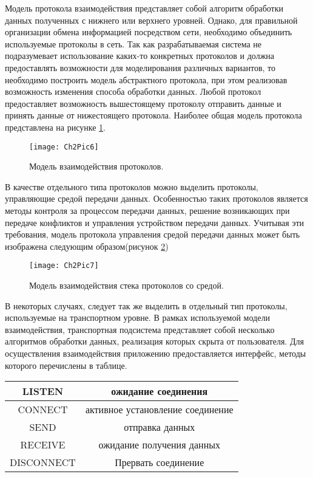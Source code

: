     Модель протокола взаимодействия представляет собой алгоритм обработки данных полученных с нижнего или верхнего уровней. Однако, для правильной организации обмена информацией посредством сети, необходимо объединить используемые протоколы в сеть. Так как разрабатываемая система не подразумевает использование каких-то конкретных протоколов и должна предоставлять возможности для моделирования различных вариантов, то необходимо построить модель абстрактного протокола, при этом реализовав возможность изменения способа обработки данных. Любой протокол предоставляет возможность вышестоящему протоколу отправить данные и принять данные от нижестоящего протокола. Наиболее общая модель протокола представлена на рисунке \ref{Pic6}.
    \begin{figure}\center
        \texttt{[image: Ch2Pic6]}
        \caption{Модель взаимодействия протоколов.} \label{Pic6}
    \end{figure}
    В качестве отдельного типа протоколов можно выделить протоколы, управляющие средой передачи данных. Особенностью таких протоколов является методы контроля за процессом передачи данных, решение возникающих при передаче конфликтов и управления устройством передачи данных. Учитывая эти требования, модель протокола управления средой передачи данных может быть изображена следующим образом(рисунок \ref{Pic7})
    \begin{figure}\center
        \texttt{[image: Ch2Pic7]}
        \caption{Модель взаимодействия стека протоколов со средой.} \label{Pic7}
    \end{figure}
    В некоторых случаях, следует так же выделить в отдельный тип протоколы, используемые на транспортном уровне. В рамках используемой модели взаимодействия, транспортная подсистема представляет собой несколько алгоритмов обработки данных, реализация которых скрыта от пользователя. Для осуществления взаимодействия приложению предоставляется интерфейс, методы которого перечислены в таблице.


    \begin{tabular}{|c|c|}
        \hline
        LISTEN & ожидание соединения \\ \hline
        CONNECT & активное установление соединение \\ \hline
        SEND & отправка данных \\ \hline
        RECEIVE & ожидание получения данных \\ \hline
        DISCONNECT & Прервать соединение \\ \hline

    \end{tabular}


